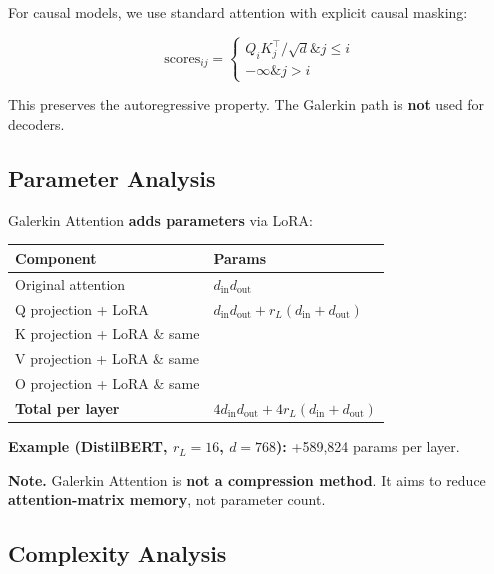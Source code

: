 For causal models, we use standard attention with explicit causal masking:

\[
\text{scores}_{ij} = \begin{cases}
Q_i K_j^\top / \sqrt{d} \& j \leq i \\
-\infty \& j > i
\end{cases}
\]

This preserves the autoregressive property. The Galerkin path is \textbf{not} 
used for decoders.

\subsection{Parameter Analysis}

Galerkin Attention \textbf{adds parameters} via LoRA:

\begin{table}[H]
\centering
\small
\begin{tabular}{ll}
\toprule
\textbf{Component} & \textbf{Params} \\
\midrule
Original attention & $d_\text{in} d_\text{out}$ \\
Q projection + LoRA & $d_\text{in} d_\text{out} + r_L(d_\text{in} + d_\text{out})$ \\
K projection + LoRA \& same \\
V projection + LoRA \& same \\
O projection + LoRA \& same \\
\textbf{Total per layer} & $4 d_\text{in} d_\text{out} + 4 r_L(d_\text{in} + d_\text{out})$ \\
\bottomrule
\end{tabular}
\end{table}

\textbf{Example (DistilBERT, $r_L = 16$, $d = 768$):} +589,824 params per layer.

\textbf{Note.} Galerkin Attention is \textbf{not a compression method}. It aims to 
reduce \textbf{attention-matrix memory}, not parameter count.

\subsection{Complexity Analysis}

